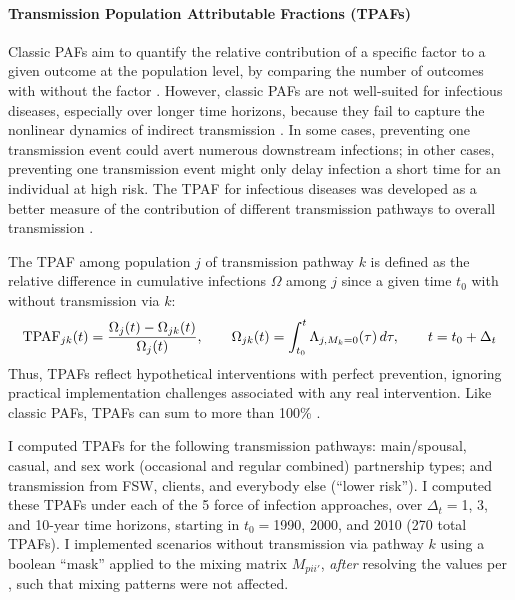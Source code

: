 \paragraph{Transmission Population Attributable Fractions (TPAFs)}
Classic PAFs aim to quantify
the relative contribution of a specific factor to a given outcome at the population level,
by comparing the number of outcomes with \vs without the factor \cite{Rockhill2011,Poole2015}.
However, classic PAFs are not well-suited for infectious diseases,
especially over longer time horizons, because
they fail to capture the nonlinear dynamics of indirect transmission \cite{Mishra2020}.
In some cases, preventing one transmission event could avert numerous downstream infections;
in other cases, preventing one transmission event might only
delay infection a short time for an individual at high risk.
The TPAF for infectious diseases was developed as a better measure of the contribution of
different transmission pathways to overall transmission \cite{Deering2008,Mishra2014,Mishra2016}.
\par
The TPAF among population $j$ of transmission pathway $k$ is defined as
the relative difference in cumulative infections $\Omega$ among $j$ since a given time $t_0$
with \vs without transmission via $k$:
\begin{equation}\label{eq:tpaf}
  \textup{TPAF}_{jk}(t) = \frac{\Omega_{j}(t) - \Omega_{jk} (t)}{\Omega_{j}(t)}
  ,\qquad
  \Omega_{jk}(t) = \int_{t_0}^{t} \Lambda_{j,M_k=0}(\tau)\,d\tau
  ,\qquad
  t = t_0 + \Delta_t
\end{equation}
Thus, TPAFs reflect hypothetical interventions with perfect prevention,
ignoring practical implementation challenges associated with any real intervention.
Like classic PAFs, TPAFs can sum to more than 100\% \cite{Rowe2004,Mishra2021}.
\par
I computed TPAFs for the following transmission pathways:
main/spousal, casual, and sex work (occasional and regular combined) partnership types; and
transmission from FSW, clients, and everybody else (``lower risk'').
I computed these TPAFs under each of the 5 force of infection approaches,
over $\Delta_t = {}$1, 3, and 10-year time horizons,
starting in $t_0 = {}$1990, 2000, and 2010 (270 total TPAFs).
I implemented scenarios without transmission via pathway $k$
using a boolean ``mask'' applied to the mixing matrix $M_{pii'}$,
\emph{after} resolving the values per ,
such that mixing patterns were not affected.
\pagebreak %
